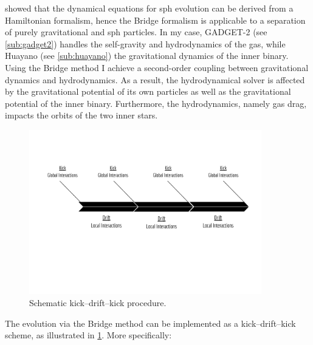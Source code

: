 \cite{saitoh2010fast} showed that the dynamical equations for \ac{sph} evolution can be derived from a Hamiltonian formalism, hence the Bridge formalism is applicable to a separation of purely gravitational and \ac{sph} particles. In my case, GADGET-2 (see \cref{sub:gadget2}) handles the self-gravity and hydrodynamics of the gas, while Huayano (see \cref{sub:huayano}) the gravitational dynamics of the inner binary. Using the Bridge method I achieve a second-order coupling between gravitational dynamics and hydrodynamics. As a result, the hydrodynamical solver is affected by the gravitational potential of its own particles as well as the gravitational potential of the inner binary. Furthermore, the hydrodynamics, namely gas drag, impacts the orbits of the two inner stars.
\begin{figure}[H]
    \centering
    \includegraphics[width=0.9\textwidth]{Thesis/figures/kick_drift_kick.pdf}
    \caption{Schematic kick–drift–kick procedure.}
    \label{fig:kick_drift_kick}
\end{figure}
The evolution via the Bridge method can be implemented as a kick–drift–kick scheme, as illustrated in \cref{fig:kick_drift_kick}. More specifically:
